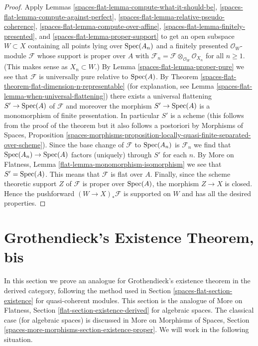 \begin{proof}
Apply Lemmas \ref{spaces-flat-lemma-compute-what-it-should-be},
\ref{spaces-flat-lemma-compute-against-perfect},
\ref{spaces-flat-lemma-relative-pseudo-coherence},
\ref{spaces-flat-lemma-compute-over-affine},
\ref{spaces-flat-lemma-finitely-presented}, and
\ref{spaces-flat-lemma-proper-support}
to get an open subspace $W \subset X$ containing all points
lying over $\operatorname{Spec}(A_n)$
and a finitely presented $\mathcal{O}_W$-module $\mathcal{F}$
whose support is proper over $A$ with
$\mathcal{F}_n = \mathcal{F} \otimes_{\mathcal{O}_W} \mathcal{O}_{X_n}$
for all $n \geq 1$. (This makes sense as $X_n \subset W$.)
By Lemma \ref{spaces-flat-lemma-proper-pure} we see that $\mathcal{F}$
is universally pure relative to $\operatorname{Spec}(A)$.
By Theorem \ref{spaces-flat-theorem-flat-dimension-n-representable}
(for explanation, see Lemma \ref{spaces-flat-lemma-when-universal-flattening})
there exists a universal flattening $S' \to \operatorname{Spec}(A)$
of $\mathcal{F}$ and moreover the morphism $S' \to \operatorname{Spec}(A)$
is a monomorphism of finite presentation.
In particular $S'$ is a scheme (this follows from the proof
of the theorem but it also follows a postoriori by
Morphisms of Spaces, Proposition
\ref{spaces-morphisms-proposition-locally-quasi-finite-separated-over-scheme}).
Since the base change of $\mathcal{F}$ to $\operatorname{Spec}(A_n)$
is $\mathcal{F}_n$ we find that $\operatorname{Spec}(A_n) \to \operatorname{Spec}(A)$
factors (uniquely) through $S'$ for each $n$.
By More on Flatness, Lemma \ref{flat-lemma-monomorphism-isomorphism}
we see that $S' = \operatorname{Spec}(A)$.
This means that $\mathcal{F}$ is flat over $A$.
Finally, since the scheme theoretic support $Z$ of $\mathcal{F}$
is proper over $\operatorname{Spec}(A)$, the morphism $Z \to X$ is closed.
Hence the pushforward $(W \to X)_*\mathcal{F}$ is supported
on $W$ and has all the desired properties.
\end{proof}

\section{Grothendieck's Existence Theorem, bis}
\label{spaces-flat-section-existence-derived}
In this section we prove an analogue for Grothendieck's existence theorem
in the derived category, following the method used in
Section \ref{spaces-flat-section-existence} for quasi-coherent modules.
This section is the analogue of
More on Flatness, Section \ref{flat-section-existence-derived}
for algebraic spaces. The classical case (for algebraic spaces)
is discussed in More on Morphisms of Spaces, Section
\ref{spaces-more-morphisms-section-existence-proper}.
We will work in the following situation.

